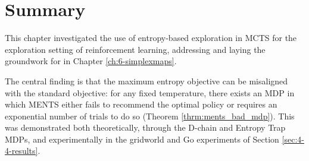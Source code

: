         
        










\section{Summary}
\label{sec:4-6-summary}

    This chapter investigated the use of entropy-based 
    exploration in MCTS for the exploration setting of 
    reinforcement learning, addressing \entropyq\ewe and 
    laying the groundwork for \contextq\ewe in Chapter 
    \ref{ch:6-simplexmaps}.

    The central finding is that the maximum entropy 
    objective can be misaligned with the standard 
    objective: for any fixed temperature, there exists 
    an MDP in which MENTS either fails to recommend the 
    optimal policy or requires an exponential number of 
    trials to do so (Theorem \ref{thrm:ments_bad_mdp}). 
    This was demonstrated both theoretically, through 
    the D-chain and Entropy Trap MDPs, and experimentally 
    in the gridworld and Go experiments of Section 
    \ref{sec:4-4-results}.

